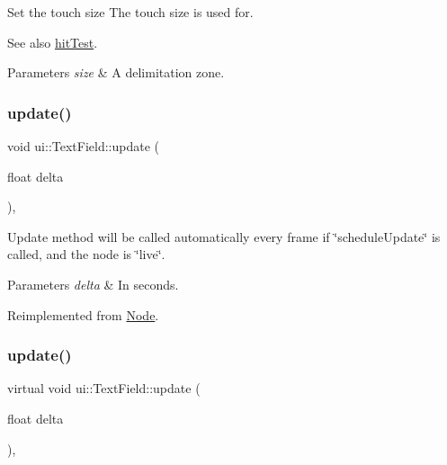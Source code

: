 Set the touch size The touch size is used for. 

\begin{DoxySeeAlso}{See also}
{\ttfamily \hyperlink{classui_1_1TextField_a2ef36bd952e7ef2842ca043662b36669}{hit\+Test}}. 
\end{DoxySeeAlso}

\begin{DoxyParams}{Parameters}
{\em size} & A delimitation zone. \\
\hline
\end{DoxyParams}
\mbox{\label{classui_1_1TextField_a9caf0239e6855d3f608946b432b9ad59}} 
\subsubsection{\texorpdfstring{update()}{update()}\hspace{0.1cm}{\footnotesize\ttfamily [1/2]}}
{\footnotesize\ttfamily void ui\+::\+Text\+Field\+::update (\begin{DoxyParamCaption}\item[{float}]{delta }\end{DoxyParamCaption})\hspace{0.3cm}{\ttfamily [override]}, {\ttfamily [virtual]}}

Update method will be called automatically every frame if \char`\"{}schedule\+Update\char`\"{} is called, and the node is \char`\"{}live\char`\"{}. 
\begin{DoxyParams}{Parameters}
{\em delta} & In seconds. \\
\hline
\end{DoxyParams}


Reimplemented from \hyperlink{classNode_a32878481ba54b3856ab53c10af13848e}{Node}.

\mbox{\label{classui_1_1TextField_a7684f9503909dfc66085922bd52ec449}} 
\subsubsection{\texorpdfstring{update()}{update()}\hspace{0.1cm}{\footnotesize\ttfamily [2/2]}}
{\footnotesize\ttfamily virtual void ui\+::\+Text\+Field\+::update (\begin{DoxyParamCaption}\item[{float}]{delta }\end{DoxyParamCaption})\hspace{0.3cm}{\ttfamily [override]}, {\ttfamily [virtual]}}

